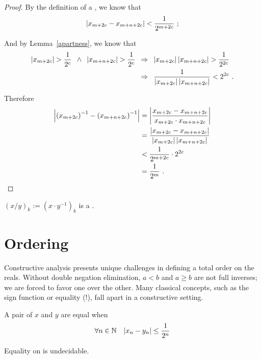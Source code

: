 \documentclass[leqno]{report}
\begin{document}
\begin{proof}
    By the definition of a \FCCS, we know that
    \[
        \left| x_{m+2c} - x_{m+n+2c} \right| < \frac{1}{2^{m+2c}} \ ;
    \]

    And by Lemma~\ref{apartness}, we know that
    \begin{align*}
        \left| x_{m+2c} \right| > \frac{1}{2^c} \enspace\wedge\enspace
        \left| x_{m+n+2c} \right| > \frac{1}{2^c}
        \enspace&\Rightarrow\enspace
        \left| x_{m+2c} \right| \left| x_{m+n+2c} \right| > \frac{1}{2^{2c}} \\
        &\Rightarrow\enspace
        \frac{1}{\left| x_{m+2c} \right| \left| x_{m+n+2c} \right|} < 2^{2c} \ .
    \end{align*}

    Therefore
    \begin{align*}
        \left| \left(x_{m+2c}\right)^{-1} - \left(x_{m+n+2c}\right)^{-1} \right|
        &= \left| \frac{x_{m+2c} - x_{m+n+2c}}{x_{m+2c} \cdot x_{m+n+2c}} \right| \\
        &= \frac{\left| x_{m+2c} - x_{m+n+2c} \right|}{\left| x_{m+2c} \right| \left| x_{m+n+2c} \right|} \\
        &< \frac{1}{2^{m+2c}} \cdot 2^{2c} \\
        &= \frac{1}{2^m} \ . \qedhere
    \end{align*}
\end{proof}

\begin{Corollary}[Division]
    $(x/y)_k := \left(x \cdot y^{-1}\right)_k$ is a \FCCS.
\end{Corollary}

\section{Ordering}

Constructive analysis presents unique challenges in defining a total order on the reals. Without double negation elimination, $a < b$ and $a \geq b$ are not full inverses; we are forced to favor one over the other. Many classical concepts, such as the sign function or equality (!), fall apart in a constructive setting.

\begin{Definition}[Equality]
    A pair of \FCCS{} $x$ and $y$ are equal when
    \[
        \forall {n \in \mathbb{N}} \quad {\left| x_n - y_n \right| \leq \frac{1}{2^n}}
    \]
\end{Definition}

\begin{Proposition}
    Equality on \FCCS{} is undecidable.
\end{Proposition}
\end{document}
